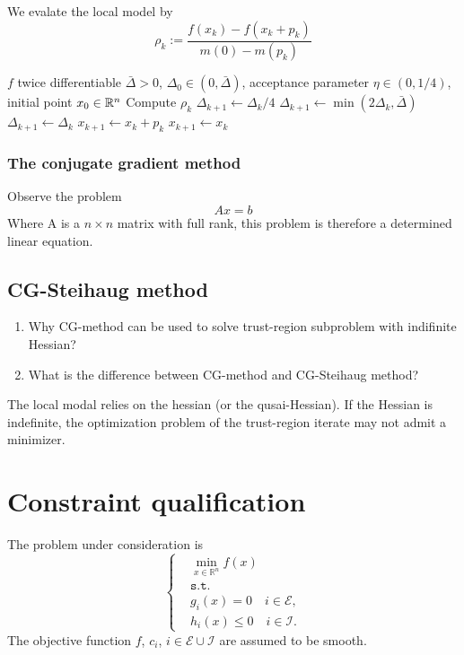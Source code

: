We evalate the local model by 
\[\rho_k := \frac{f(x_k) - f(x_k + p_k)}{m(0) - m(p_k)}\]

\begin{algorithm}
\caption{Vanilla trust-region method}
\begin{algorithmic}[1]
\Require $f$ twice differentiable
\Require $\bar{\Delta}>0$, $\Delta_0\in(0,\bar{\Delta})$, acceptance parameter $\eta\in(0,1/4)$, initial point $x_0\in\mathbb{R}^n$
  \State Compute $\rho_k$ 
    \State $\Delta_{k+1} \gets \Delta_k/4$
    \State $\Delta_{k+1} \gets \min(2\Delta_k,\bar{\Delta})$
  \Else
    \State $\Delta_{k+1} \gets \Delta_k$
  \EndIf
    \State $x_{k+1} \gets x_k + p_k$ 
  \Else
    \State $x_{k+1} \gets x_k$ 
  \EndIf
\EndFor
\end{algorithmic}
\end{algorithm}



\subsubsection{The conjugate gradient method}
Observe the problem
\[ Ax = b\]
Where A is a $n \times n$ matrix with full rank, this problem is therefore a determined linear equation. 



\subsection{CG-Steihaug method}
\begin{enumerate}
	\item Why CG-method can be used to solve trust-region subproblem with indifinite Hessian?
	\item What is the difference between CG-method and CG-Steihaug method?
\end{enumerate}

The local modal relies on the hessian (or the qusai-Hessian). If the Hessian is indefinite, the optimization problem of the trust-region iterate may not admit a minimizer. 



\newpage
\section{Constraint qualification}
The problem under consideration is 
\begin{equation}
	\left\{
	\begin{aligned}
	&\min_{x \in \mathbb{R}^n} f(x)\\
	&\texttt{s.t.}\\
	&g_i(x) = 0 \quad i \in \mathcal{E},\\
	&h_i(x) \le 0 \quad i \in \mathcal{I}. 
\end{aligned}
\tag{NLP}
\label{NLP}
\right.
\end{equation}
The objective function $f$, $c_i$, $i \in \mathcal{E} \cup \mathcal{I}$ are assumed to be smooth. 

